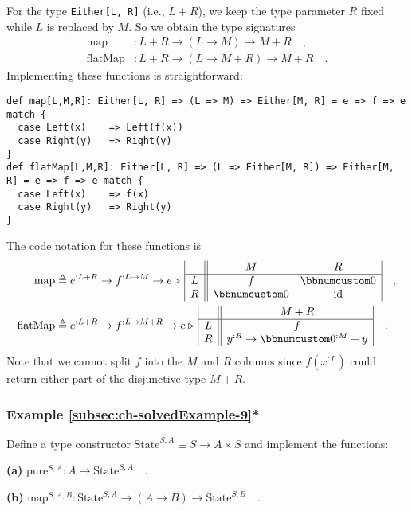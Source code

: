 For the type \lstinline!Either[L, R]! (i.e., $L+R$), we keep the
type parameter $R$ fixed while $L$ is replaced by $M$. So we obtain
the type signatures
\begin{align*}
\text{map} & :L+R\rightarrow(L\rightarrow M)\rightarrow M+R\quad,\\
\text{flatMap} & :L+R\rightarrow(L\rightarrow M+R)\rightarrow M+R\quad.
\end{align*}
Implementing these functions is straightforward:
\begin{lstlisting}
def map[L,M,R]: Either[L, R] => (L => M) => Either[M, R] = e => f => e match {
  case Left(x)    => Left(f(x))
  case Right(y)   => Right(y)
}
def flatMap[L,M,R]: Either[L, R] => (L => Either[M, R]) => Either[M, R] = e => f => e match {
  case Left(x)    => f(x)
  case Right(y)   => Right(y)
}
\end{lstlisting}
The code notation for these functions is
\begin{align*}
\text{map} & \triangleq e^{:L+R}\rightarrow f^{:L\rightarrow M}\rightarrow e\triangleright\,\begin{array}{|c||cc|}
 & M & R\\
\hline L & f & \bbnum 0\\
R & \bbnum 0 & \text{id}
\end{array}\quad,\\
\text{flatMap} & \triangleq e^{:L+R}\rightarrow f^{:L\rightarrow M+R}\rightarrow e\triangleright\,\begin{array}{|c||c|}
 & M+R\\
\hline L & f\\
R & y^{:R}\rightarrow\bbnum 0^{:M}+y
\end{array}\quad.
\end{align*}
Note that we cannot split $f$ into the $M$ and $R$ columns since
$f(x^{:L})$ could return either part of the disjunctive type $M+R$.

\subsubsection{Example \label{subsec:ch-solvedExample-9}\ref{subsec:ch-solvedExample-9}{*}}

Define a type constructor $\text{State}^{S,A}\equiv S\rightarrow A\times S$
and implement the functions:

\textbf{(a)} $\text{pure}^{S,A}:A\rightarrow\text{State}^{S,A}\quad.$

\textbf{(b)} $\text{map}^{S,A,B}:\text{State}^{S,A}\rightarrow(A\rightarrow B)\rightarrow\text{State}^{S,B}\quad.$

